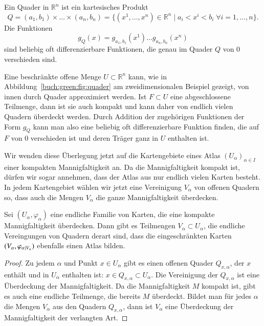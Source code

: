 Ein Quader in $\mathbb{R}^n$ ist ein kartesisches Produkt
\[
Q
=
(a_1,b_1)
\times\dots\times
(a_n,b_n)
=
\{
(x^1,\dots,x^n)\in\mathbb{R}^n
\mid
a_i < x^i < b_i
\;\forall i=1,\dots,n
\}.
\]
Die Funktionen
\[
g_Q(x)
=
g_{a_1,b_1}(x^1)\dots g_{a_n,b_n}(x^n)
\]
sind beliebig oft differenzierbare Funktionen, die genau im Quader
$Q$ von $0$ verschieden sind.

Eine beschränkte offene Menge $U\subset\mathbb{R}^n$ kann, wie in
%
Abbildung~\ref{buch:green:fig:quader} am zweidimensionalen Beispiel gezeigt,
von innen durch Quader approximiert werden.
Ist $F\subset U$ eine abgeschlossene Teilmenge, dann ist sie auch
kompakt und kann daher von endlich vielen Quadern überdeckt werden.
Durch Addition der zugehörigen Funktionen der Form $g_Q$ kann man also
eine beliebig oft differenzierbare Funktion finden, die auf $F$ von
$0$ verschieden ist und deren Träger ganz in $U$ enthalten ist.

Wir wenden diese Überlegung jetzt auf die Kartengebiete eines
Atlas $(U_\alpha)_{\alpha\in I}$ einer kompakten Mannigfaltigkeit an.
Da die Mannigfaltigkeit kompakt ist, dürfen wir sogar annehmen, dass
der Atlas aus nur endlich vielen Karten besteht.
In jedem Kartengebiet wählen wir jetzt eine Vereinigung $V_\alpha$
von offenen Quadern so, dass auch die Mengen $V_\alpha$ die ganze
Mannigfaltigkeit überdecken.

\begin{satz}
Sei $(U_\alpha,\varphi_\alpha)$ eine endliche Familie von Karten,
die eine kompakte Mannigfaltigkeit überdecken.
Dann gibt es Teilmengen $V_\alpha\subset U_\alpha$, die endliche
Vereingungen von Quadern derart sind, dass die eingeschränkten Karten
$(V_\alpha,\varphi_\alpha\mathstrut_{|V_\alpha})$ ebenfalls einen Atlas
bilden.
\end{satz}

\begin{proof}
Zu jedem $\alpha$ und Punkt $x\in U_\alpha$ gibt es einen offenen
Quader $Q_{x,\alpha}$, der $x$ enthält und in $U_\alpha$ enthalten
ist: $x\in Q_{x,\alpha}\subset U_\alpha$.
Die Vereinigung der $Q_{x,\alpha}$ ist eine Überdeckung der
Mannigfaltigkeit.
Da die Mannigfaltigkeit $M$ kompakt ist, gibt es auch eine endliche 
Teilmenge, die bereits $M$ überdeckt.
Bildet man für jedes $\alpha$ die Mengen $V_\alpha$ aus den Quadern
$Q_{x,\alpha}$, dann ist $V_\alpha$ eine Überdeckung der Mannigfaltigkeit
der verlangten Art.
\end{proof}

